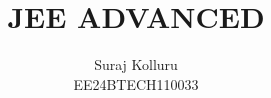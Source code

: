 \documentclass[journal,12pt,twocolumn]{IEEEtran}
\theoremstyle{remark}
\begin{document}
%









\title{JEE ADVANCED}
\author{Suraj Kolluru

EE24BTECH110033
}	



%
%
%

% 
%



% 
\end{document}
